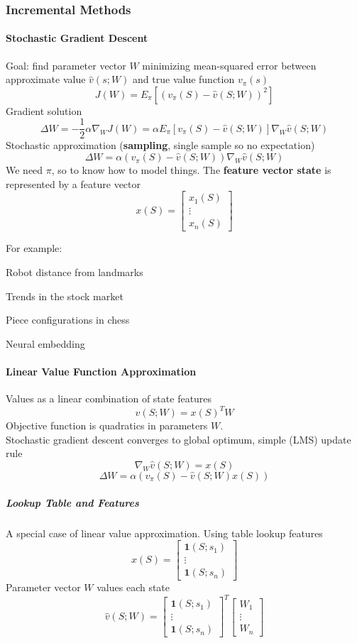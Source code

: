 \documentclass[10pt]{report}
\begin{document}
\subsubsection{Incremental Methods}
\paragraph{Stochastic Gradient Descent} Goal: find parameter vector $W$ minimizing mean-squared error between approximate value $\hat{v}(s;W)$ and true value function $v_\pi(s)$
$$J(W) = E_\pi[(v_\pi(S)-\hat{v}(S;W))^2]$$
Gradient solution
$$\Delta W= -\frac{1}{2}\alpha\nabla_{W}J(W) = \alpha E_\pi[v_\pi(S) - \hat{v}(S;W)]\nabla_W\hat{v}(S;W)$$
Stochastic approximation (\textbf{sampling}, single sample so no expectation)
$$\Delta W=\alpha(v_\pi(S)-\hat{v}(S;W))\nabla_W\hat{v}(S;W)$$
We need $\pi$, so to know how to model things. The \textbf{feature vector state} is represented by a feature vector
$$x(S)=\left[\begin{array}{c}
x_1(S)\\\vdots\\x_n(S)
\end{array}\right]$$
\pagebreak

For example:
\begin{list}{}{}
	\item Robot distance from landmarks
	\item Trends in the stock market
	\item Piece configurations in chess
	\item Neural embedding
\end{list}
\paragraph{Linear Value Function Approximation} Values as a linear combination of state features $$\hat{v}(S;W) = x(S)^TW$$
Objective function is quadratics in parameters $W$.\\
Stochastic gradient descent converges to global optimum, simple (LMS) update rule
$$\nabla_W\hat{v}(S;W)=x(S)$$
$$\Delta W=\alpha(v_\pi(S)-\hat{v}(S;W)x(S))$$
\subparagraph{Lookup Table and Features} A special case of linear value approximation. Using table lookup features
$$x(S)=\left[\begin{array}{c}
\mathbf{1}(S;s_1)\\\vdots\\\mathbf{1}(S;s_n)
\end{array}\right]$$
Parameter vector $W$ values each state
$$\hat{v}(S;W)=\left[\begin{array}{c}
\mathbf{1}(S;s_1)\\\vdots\\\mathbf{1}(S;s_n)
\end{array}\right]^T\left[\begin{array}{c}
W_1\\\vdots\\W_n
\end{array}\right]$$
\end{document}
